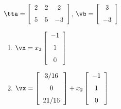 {$\tta = \left[ \begin {array}{ccc} 2&2&2\\\noalign{\medskip}5&5&-3
\end {array} \right]  $, $\vb=\left[ \begin {array}{c} 3\\\noalign{\medskip}-3\end {array} \right] $}
{\begin{enumerate}
\item	 $\vx=x_2\left[ \begin {array}{c} -1\\\noalign{\medskip}1\\\noalign{\medskip}0\end {array} \right]$
\item	 $\vx=\left[ \begin {array}{c} 3/16\\\noalign{\medskip}0\\\noalign{\medskip}{21/16}\end {array}
\right]+x_2\left[ \begin {array}{c} -1\\\noalign{\medskip}1\\\noalign{\medskip}0\end {array} \right]$
\end{enumerate}}

 







